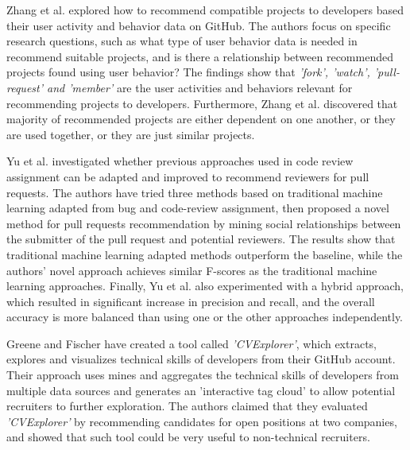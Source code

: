         Zhang et al. \cite{zhang2014recommending} explored how to recommend compatible projects to developers based their user activity and behavior data on GitHub. The authors focus on specific research questions, such as what type of user behavior data is needed in recommend suitable projects, and is there a relationship between recommended projects found using user behavior? The findings show that \emph{'fork', 'watch', 'pull-request' and 'member'} are the user activities and behaviors relevant for recommending projects to developers. Furthermore, Zhang et al. discovered that majority of recommended projects are either dependent on one another, or they are used together, or they are just similar projects.
        
        Yu et al. \cite{yu2016reviewer} investigated whether previous approaches used in code review assignment can be adapted and improved to recommend reviewers for pull requests. The authors have tried three methods based on traditional machine learning adapted from bug and code-review assignment, then proposed a novel method for pull requests recommendation by mining social relationships between the submitter of the pull request and potential reviewers. The results show that traditional machine learning adapted methods outperform the baseline, while the authors' novel approach achieves similar F-scores as the traditional machine learning approaches. Finally, Yu et al. also experimented with a hybrid approach, which resulted in significant increase in precision and recall, and the overall accuracy is more balanced than using one or the other approaches independently.
        
        Greene and Fischer \cite{greene2016cvexplorer} have created a tool called \emph{'CVExplorer'}, which extracts, explores and visualizes technical skills of developers from their GitHub account. Their approach uses mines and aggregates the technical skills of developers from multiple data sources and generates an 'interactive tag cloud' to allow potential recruiters to further exploration. The authors claimed that they evaluated \emph{'CVExplorer'} by recommending candidates for open positions at two companies, and showed that such tool could be very useful to non-technical recruiters. 
    
